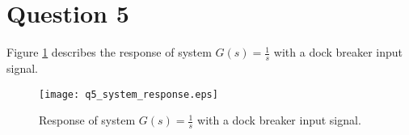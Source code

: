 \section{Question 5}
Figure \ref{fig:q5_system_response} describes the response of system $G(s)=\frac{1}{s}$ with a dock breaker input signal.

\begin{figure}[h!]
	\centering
	\texttt{[image: q5\_system\_response.eps]}
	\caption{Response of system $G(s)=\frac{1}{s}$ with a dock breaker input signal.}
	\label{fig:q5_system_response}
\end{figure}